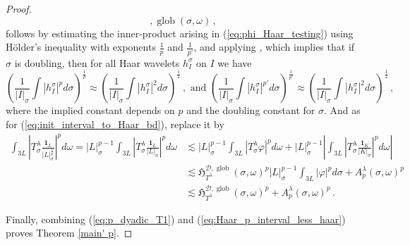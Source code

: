 \documentclass{amsart}%
\theoremstyle{plain}
\numberwithin{equation}{section}
\begin{document}
\begin{proof}
\[{,\operatorname*{glob}}\left(  \sigma,\omega\right) \, , 
	\]follows by estimating the inner-product arising in (\ref{eq:phi_Haar_testing}) using H\"older's inequality with exponents $\frac{1}{p}$ and $\frac{1}{p'}$, and applying \cite[(4.7)]{Saw6},
which implies that if $\sigma$ is doubling, then for all Haar
wavelets $h_{I}^{\sigma}$ on $I$ we have
	\begin{equation}\label{eq:Lp_to_L2_Haar}
	\left ( \frac{1}{\left | I \right|_{\sigma}} \int  \left |  h_{I}^{\sigma}\right |^p d \sigma \right )^{\frac{1}{p}}  \approx\left ( \frac{1}{\left | I \right|_{\sigma}} \int  \left |  h_{I}^{\sigma}\right |^2 d \sigma \right )^{\frac{1}{2}} \, , \text{ and }\left ( \frac{1}{\left | I \right|_{\sigma}} \int  \left |  h_{I}^{\sigma}\right |^{p'} d \sigma \right )^{\frac{1}{p'}}  \approx\left ( \frac{1}{\left | I \right|_{\sigma}} \int  \left |  h_{I}^{\sigma}\right |^2 d \sigma \right )^{\frac{1}{2}}  \,,
	\end{equation}
where the implied constant depends on $p$ and the doubling constant for
$\sigma$. And as for (\ref{eq:init_interval_to_Haar_bd}), replace it 
by
\begin{align}
\int_{3L}\left\vert T_{\sigma}^{\lambda}\frac{\mathbf{1}_{L}}{\left\vert
L\right\vert _{\sigma}^{\frac{1}{p}}}\right\vert ^{p}d\omega=\left\vert
L\right\vert _{\sigma}^{p-1}\int_{3L}\left\vert T_{\sigma}^{\lambda}%
\frac{\mathbf{1}_{L}}{\left\vert L\right\vert _{\sigma}}\right\vert
	^{p}d\omega  &\lesssim\left\vert L\right\vert _{\sigma}^{p-1}\int_{3L}\left\vert
T_{\sigma}^{\lambda}\varphi\right\vert ^{p}d\omega+\left\vert L\right\vert
_{\sigma}^{p-1}\left\vert \int_{3L}\left\vert T_{\sigma}^{\lambda}%
\frac{\mathbf{1}_{K}}{\left\vert K\right\vert _{\sigma}}\right\vert
^{p}d\omega\right\vert \label{eq:p_interval_to_Haar_bd} \\
&  \lesssim\mathfrak{H}_{T^{\lambda}}^{\mathcal{D},\operatorname*{glob}%
}\left(  \sigma,\omega\right)  ^{p}\left\vert L\right\vert _{\sigma}^{p-1}%
\int_{3L}\left\vert \varphi\right\vert ^{p}d\sigma+A_{p}^{\lambda}\left(
\sigma,\omega\right)  ^{p}\nonumber\\
&  \lesssim\mathfrak{H}_{T^{\lambda}}^{\mathcal{D},\operatorname*{glob}%
}\left(  \sigma,\omega\right)  ^{p}+A_{p}^{\lambda}\left(  \sigma
,\omega\right)  ^{p}\,.\nonumber
\end{align}


Finally, combining (\ref{eq:p_dyadic_T1}) and
(\ref{eq:Haar_p_interval_less_haar}) proves Theorem \ref{main' p}.
\end{proof}
\end{document}
